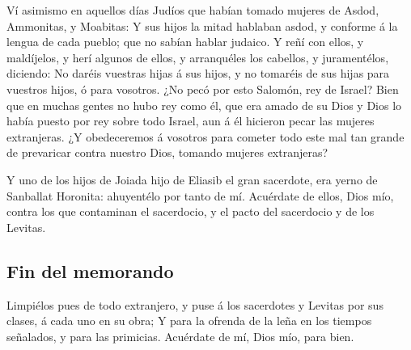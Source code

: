  Ví asimismo en aquellos días Judíos que habían tomado
mujeres de Asdod, Ammonitas, y Moabitas:  Y sus hijos la
mitad hablaban asdod, y conforme á la lengua de cada pueblo; que no
sabían hablar judaico.  Y reñí con ellos, y maldíjelos, y
herí algunos de ellos, y arranquéles los cabellos, y juramentélos,
diciendo: No daréis vuestras hijas á sus hijos, y no tomaréis de sus
hijas para vuestros hijos, ó para vosotros.  ¿No pecó por
esto Salomón, rey de Israel? Bien que en muchas gentes no hubo rey como
él, que era amado de su Dios y Dios lo había puesto por rey sobre todo
Israel, aun á él hicieron pecar las mujeres extranjeras. 
¿Y obedeceremos á vosotros para cometer todo este mal tan grande de
prevaricar contra nuestro Dios, tomando mujeres extranjeras?

 Y uno de los hijos de Joiada hijo de Eliasib el gran
sacerdote, era yerno de Sanballat Horonita: ahuyentélo por tanto de mí.
 Acuérdate de ellos, Dios mío, contra los que contaminan el
sacerdocio, y el pacto del sacerdocio y de los Levitas.

\hypertarget{fin-del-memorando}{%
\subsection{Fin del memorando}\label{fin-del-memorando}}

 Limpiélos pues de todo extranjero, y puse á los sacerdotes
y Levitas por sus clases, á cada uno en su obra;  Y para la
ofrenda de la leña en los tiempos señalados, y para las primicias.
Acuérdate de mí, Dios mío, para bien.
